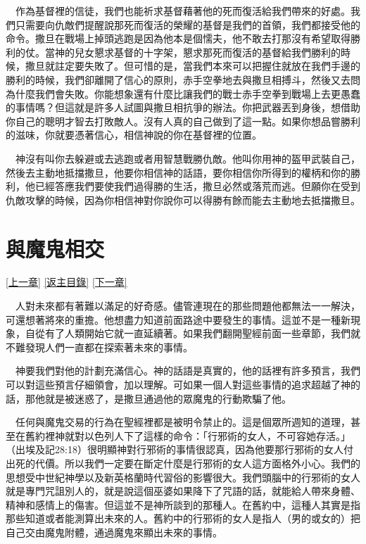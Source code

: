 \documentclass{book}
\begin{document}
　作為基督裡的信徒，我們也能祈求基督藉著他的死而復活給我們帶來的好處。我們只需要向仇敵們提醒說那死而復活的榮耀的基督是我們的首領，我們都接受他的命令。撒旦在戰場上掉頭逃跑是因為他本是個懦夫，他不敢去打那沒有希望取得勝利的仗。當神的兒女懇求基督的十字架，懇求那死而復活的基督給我們勝利的時候，撒旦就註定要失敗了。但可惜的是，當我們本來可以把握住就放在我們手邊的勝利的時候，我們卻離開了信心的原則，赤手空拳地去與撒旦相搏斗，然後又去問為什麼我們會失敗。你能想象還有什麼比讓我們的戰士赤手空拳到戰場上去更愚蠢的事情嗎？但這就是許多人試圖與撒旦相抗爭的辦法。你把武器丟到身後，想借助你自己的聰明才智去打敗敵人。沒有人真的自己做到了這一點。如果你想品嘗勝利的滋味，你就要憑著信心，相信神說的你在基督裡的位置。

　神沒有叫你去躲避或去逃跑或者用智慧戰勝仇敵。他叫你用神的盔甲武裝自己，然後去主動地抵擋撒旦，他要你相信神的話語，要你相信你所得到的權柄和你的勝利，他已經答應我們要使我們過得勝的生活，撒旦必然或落荒而逃。但願你在受到仇敵攻擊的時候，因為你相信神對你說你可以得勝有餘而能去主動地去抵擋撒旦。

\chapter{與魔鬼相交}
\label{sec:ch19}
\hyperref[sec:ch18]{[上一章]}
\hyperlink{toc}{[返主目錄]}
\hyperref[sec:ch20]{[下一章]}

\begin{center}
\noindent{}
\end{center}

　人對未來都有著難以滿足的好奇感。儘管連現在的那些問題他都無法一一解決，可還想著將來的重擔。他想盡力知道前面路途中要發生的事情。這並不是一種新現象，自從有了人類開始它就一直延續著。如果我們翻開聖經前面一些章節，我們就不難發現人們一直都在探索著未來的事情。

　神要我們對他的計劃充滿信心。神的話語是真實的，他的話裡有許多預言，我們可以對這些預言仔細領會，加以理解。可如果一個人對這些事情的追求超越了神的話，那他就是被迷惑了，是撒旦通過他的眾魔鬼的行動欺騙了他。

　任何與魔鬼交易的行為在聖經裡都是被明令禁止的。這是個眾所週知的道理，甚至在舊約裡神就對以色列人下了這樣的命令：「行邪術的女人，不可容她存活。」（出埃及記28:18）很明顯神對行邪術的事情很認真，因為他要那行邪術的女人付出死的代價。所以我們一定要在斷定什麼是行邪術的女人這方面格外小心。我們的思想受中世紀神學以及新英格蘭時代習俗的影響很大。我們頭腦中的行邪術的女人就是專門咒詛別人的，就是說這個巫婆如果降下了咒語的話，就能給人帶來身體、精神和感情上的傷害。但這並不是神所談到的那種人。在舊約中，這種人其實是指那些知道或者能測算出未來的人。舊約中的行邪術的女人是指人（男的或女的）把自己交由魔鬼附體，通過魔鬼來顯出未來的事情。
\end{document}
